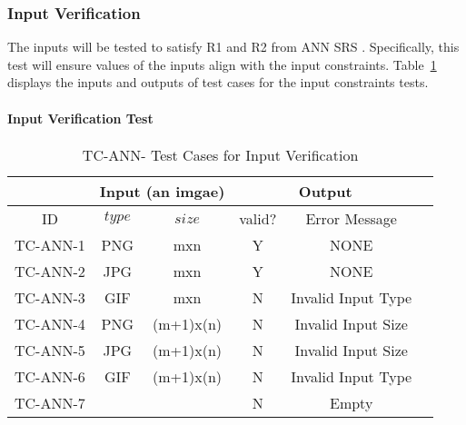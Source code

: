 \documentclass[12pt, titlepage]{article}
\begin{document}

\subsubsection{Input Verification} \label{InputVerification}

The inputs will be tested to satisfy R1 and R2 from ANN 
SRS \cite{SRS}. Specifically,
this test will ensure values of the inputs align with the input constraints.
Table~\ref{TCInput} displays the inputs and outputs of test cases for the input constraints
tests.
		
\paragraph{Input Verification Test} 
\begin{center}
  \begin{table}[h]
  \resizebox{\textwidth}{!}
  { %
      \begin{tabular}{ lccccc }
      \hline
      \multicolumn{1}{l|}{}   & \multicolumn{2}{c|}{Input (an imgae) }                            & \multicolumn{2}{c}{Output} \\ 
      
      \hline
      
      \multicolumn{1}{c|}{ID} &   $type$   &   \multicolumn{1}{c|}{$size$}   &   valid?   &   Error Message \\ \hline
      
      TC-ANN-1   &   PNG  & mxn        &  Y  & NONE               \\
      TC-ANN-2   &   JPG  & mxn        &  Y  & NONE               \\
      TC-ANN-3   &   GIF  & mxn        &  N  & Invalid Input Type  \\ 
      TC-ANN-4   &   PNG  & (m+1)x(n)  &  N  & Invalid Input Size   \\
      TC-ANN-5   &   JPG  & (m+1)x(n)  &  N  & Invalid Input Size    \\
      TC-ANN-6   &   GIF  & (m+1)x(n)  &  N  & Invalid Input Type \\
      TC-ANN-7   &        &            &  N  & Empty      \\
      \hline
      
      
      \end{tabular} %
  }
  \caption{TC-ANN- Test Cases for Input Verification}
  \label{TCInput}
  \end{table}
  \end{center}
\end{document}
